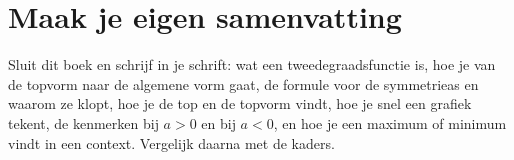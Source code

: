 
\ifzelfstudie
\section*{Maak je eigen samenvatting}
Sluit dit boek en schrijf in je schrift: wat een tweedegraadsfunctie is, hoe je van de topvorm naar de algemene vorm gaat, de formule voor de symmetrieas en waarom ze klopt, hoe je de top en de topvorm vindt, hoe je snel een grafiek tekent, de kenmerken bij $a > 0$ en bij $a < 0$, en hoe je een maximum of minimum vindt in een context. Vergelijk daarna met de kaders.
\fi
